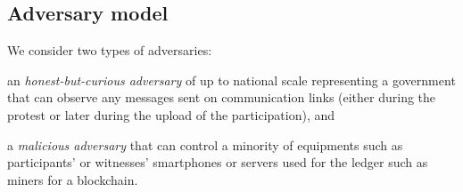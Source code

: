 
\subsection{Adversary model}
\label{adversary-model}

We consider two types of adversaries: 
\begin{enumerate*} 
\item an \emph{honest-but-curious adversary} of up to national scale representing a government that can observe any
messages sent on communication links (\ie either during the protest or later during the upload of the participation), and 
\item a \emph{malicious adversary} that can control a minority of equipments such as participants' or witnesses' smartphones or servers used for the ledger such as miners for a blockchain. 
\end{enumerate*}

